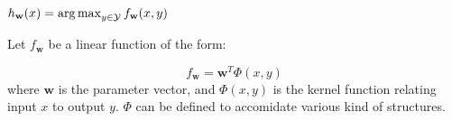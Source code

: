  $h_{\mathbf{w}}(x) = \operatorname*{arg\,max}_{y\in\mathcal{Y}} f_{\mathbf{w}}(x,y)$
 
 Let $f_{\mathbf{w}}$ be a linear function of the form:

 $$ f_{\mathbf{w}} = \mathbf{w}^{T}\Phi(x,y)$$
 where $\mathbf{w}$ is the parameter vector, and $\Phi(x,y)$ is the kernel function relating input $x$ to output $y$. $\Phi$ can be defined to accomidate various kind of structures. 





                  

              

